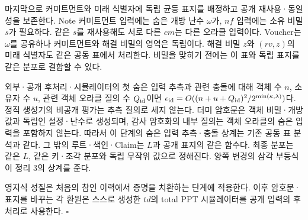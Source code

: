 마지막으로 커미트먼트와 미래 식별자에 독립 균등 표지를 배정하고
공개 재사용·동일성을 보존한다.
Note 커미트먼트 입력에는 숨은 개방 난수 $\omega$가,
$nf$ 입력에는 소유 비밀 $s$가 필요하다.
같은 $s$를 재사용해도 서로 다른 $cm$는 다른 오라클 입력이다.
Voucher는 $\omega$를 공유하나 커미트먼트와 해결 비밀의 영역은
독립이다. 해결 비밀 $z$와 $(rv,z)$의 미래 식별자도 같은 공동
표에서 처리한다. 비밀을 맞히기 전에는 이 표와 독립 표지를
같은 분포로 결합할 수 있다.

외부·공개 후처리·시뮬레이터의 첫 숨은 입력 추측과 관련 충돌에
대해 객체 수 $n$, 소유자 수 $u$, 관련 객체 오라클 질의 수 $Q_{\rm id}$이면
$\epsilon_{\rm id}=O((n+u+Q_{\rm id})^2/2^{\min(\kappa,\lambda)})$다.
정직 생성기의 비공개 평가는 추측 질의로 세지 않는다.
더미 암호문은 객체 비밀·개방값과 독립인 설정·난수로 생성되며,
감사 암호화의 내부 질의는 객체 오라클의 숨은 입력을 포함하지 않는다.
따라서 이 단계의 숨은 입력 추측·충돌 상계는 기존 공동 표 분석과 같다.
그 밖의 루트·색인·Claim는 $L$과 공개 표지의 같은 함수다.
최종 분포는 같은 $L$, 같은 키·조각 분포와 독립 무작위 값으로
정해진다. 양쪽 변경의 삼각 부등식이 정리 3의 상계를 준다.

영지식 성질은 처음의 참인 이력에서 증명을 치환하는 단계에 적용한다.
이후 암호문·표지를 바꾸는 각 환원은 스스로 생성한 $td$의
total PPT 시뮬레이터를 공개 입력의 후처리로 사용한다. $\square$
